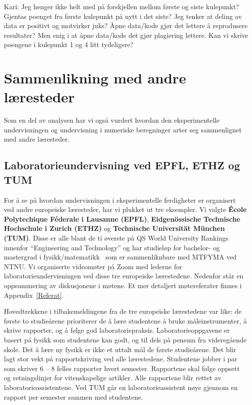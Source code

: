 \documentclass{article}
\begin{document}
\begin{itemize}
  {\color{red} Kari: Jeg henger ikke helt med på forskjellen mellom første og siste kulepunkt? Gjentas poenget fra første kulepunkt på nytt i det siste? Jeg tenker at deling av data er positivt og motvirker juks? Åpne data/kode gjør det lettere å reprodusere resultater? Men enig i at åpne data/kode det gjør plagiering lettere. Kan vi skrive poengene i kulepunkt 1 og 4 litt tydeligere? }
\end{itemize}

\section{Sammenlikning med andre læresteder}
Som en del av analysen har vi også vurdert hvordan den eksperimentelle undervisningen og undervisning i numeriske beregninger arter seg sammenlignet med andre læresteder.

\subsection{Laboratorieundervisning ved EPFL, ETHZ og TUM}
For å se på hvordan undervisningen i eksperimentelle ferdigheter er organisert ved andre europeiske læresteder, har vi plukket ut tre eksempler. Vi valgte \textbf{École Polytechique Féderale i Lausanne (EPFL)}, \textbf{Eidgenössische Technische Hochschule i Zurich (ETHZ)} og \textbf{Technische Universität München (TUM)}. Disse er alle blant de ti øverste på QS World University Rankings innenfor ``Engineering and Technology'' og har studieløp for bachelor- og mastergrad i fysikk/matematikk~\cite{ETHZprog,EPFLprog,TUMprog} som er sammenliknbare med MTFYMA ved NTNU.
Vi organiserte videomøter på Zoom med lederne for laboratorieundervisningen ved disse tre europeiske lærestedene. Nedenfor står en oppsummering av diskusjonene i møtene. Et mer detaljert møtereferater finnes i Appendix~\ref{Referat}.

Hovedtrekkene i tilbakemeldingene fra de tre europeiske lærestedene var like: de første to studieårene prioriterer de å lære studentene å bruke måleinstrumenter, å skrive rapporter, og å følge god laboratoriepraksis. Laboratorieoppgavene er basert på fysikk som studentene kan godt, og til dels på pensum fra videregående skole. Det å lære ny fysikk er ikke et uttalt mål de første studieårene. Det blir lagt stor vekt på rapportskriving ved alle lærestedene. Studentene jobber i par som skriver 6 – 8 felles rapporter hvert semester. Rapportene skal følge oppsett og retningslinjer for vitenskapelige artikler. Alle rapportene blir rettet av laboratorieassistentene. Ved TUM går en laboratorieassistent nøye gjennom en rapport per semester sammen med studentene. 
\end{document}
